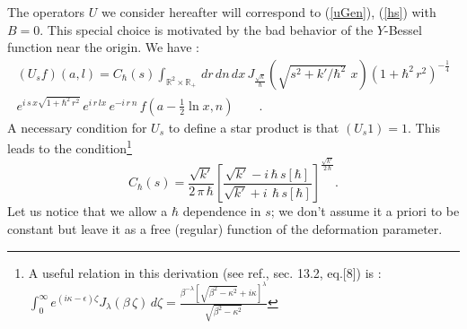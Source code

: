 \documentclass{article}
\newcommand{\R}{\mathbb R}
\def \R{{\mathbb R}}
\newcommand{\re}[1]{(\ref{#1})}
\begin{document}
\noindent The operators $U$ we consider hereafter will correspond  to \re{uGen}, \re{hs} with $B=0$. This special choice is motivated by the bad behavior of the $Y$-Bessel function near the origin. We have :
\begin{eqnarray}\label{USF}
 (U_s f)(a,l) =  C_\hbar (s) \int_{\R^2\times\R_+} \, dr \, dn\, dx\, J_{\frac{\sqrt{k}}{\hbar}}(\sqrt{s^2 + k'/\hbar^2}\, \,x) (1+\hbar^2 \,r^2)^{-\frac{1}{4}} \nonumber\\
  e^{i \,s\, x \sqrt{1+\hbar^2\, r^2}} \, e^{i \,r\, l x} \, e^{-i\, r\, n} \, f(a-\frac{1}{2}\ln x,n)\qquad.
\end{eqnarray}
A necessary condition for $U_s$ to define a star product is that $(U_s 1) = 1$. This leads to the condition\footnote{A useful relation in this derivation (see ref.\cite{Wa}, sec. 13.2, eq.[8]) is :
$
\int_0^\infty e^{(i\kappa-\epsilon)\zeta}J_\lambda (\beta\,\zeta)\,d\zeta=\frac{\beta^{-\lambda }[\sqrt{\beta^2-\kappa^2}+i\kappa]^{\lambda }}{\sqrt{\beta^2-\kappa^2}}
$}
\begin{equation}\label{Cnorm}
  C_\hbar(s) = \frac{ \sqrt{k'}}{2\,\pi\,\hbar}\left[ \frac{\sqrt{k'} - i \,\hbar\,s[\hbar]}{\sqrt{k'} + i \,\  \hbar\,s[\hbar]} \right]^{\frac{\sqrt{k'}}{2\,\hbar}}.
\end{equation}
Let us notice that we allow a $\hbar$ dependence in  $s$; we don't assume it a priori to be constant but  leave it as a free (regular) function of the deformation parameter.
\end{document}
